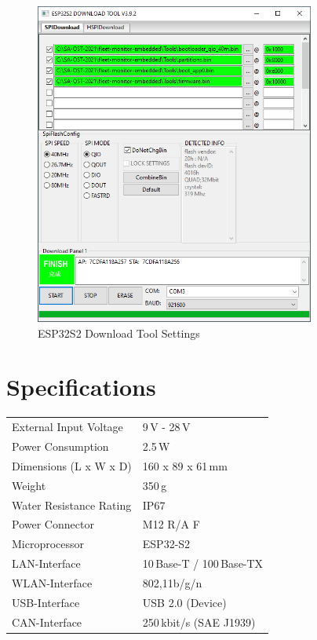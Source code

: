 \begin{figure}[h!]
	\centering
	\includegraphics[width=9.2cm]{images/ESP32_Firmware_Settings}
	\caption{ESP32S2 Download Tool Settings}
	\label{fig:esp32s2-download-tool-settings}
\end{figure}
\newpage

\section{Specifications}
\begin{center}
    \begin{tabular}{p{6.4cm} p{6.4cm}}
    External Input Voltage          & 9\,V - 28\,V                      \\ %
    Power Consumption               & 2.5\,W                            \\ %
    Dimensions (L x W x D)          & 160 x 89 x 61\,mm                 \\ %
    Weight                          & 350\,g                            \\ %
    Water Resistance Rating         & IP67                              \\ %
    Power Connector                 & M12 R/A F                         \\ %
    Microprocessor                  & ESP32-S2                          \\ %
    LAN-Interface                   & 10\,Base-T / 100\,Base-TX         \\ %
    WLAN-Interface                  & 802,11b/g/n                       \\ %
    USB-Interface                   & USB 2.0 (Device)                  \\ %
    CAN-Interface                   & 250\,kbit/s (SAE J1939)           \\ %
    
    \end{tabular}
\end{center}

